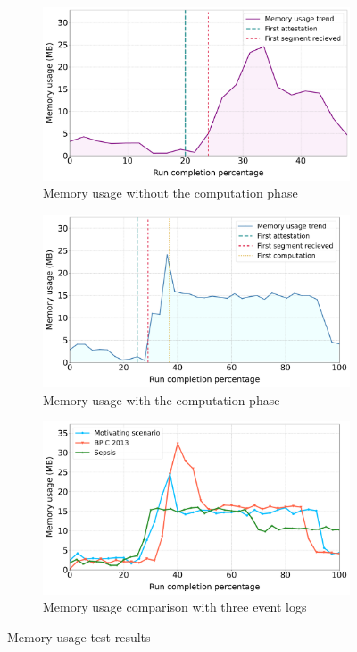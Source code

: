 \begin{figure}[t]
\centering
\begin{subfigure}{0.49\textwidth}
  \centering
  \includegraphics[width=\textwidth]{content/figures/memoryusage1-2.pdf}
  \caption{Memory usage without the computation phase}
  \label{snr_a}
\end{subfigure}\hfill
\begin{subfigure}{0.49\textwidth}
  \centering
  \includegraphics[width=\textwidth]{content/figures/memoryusage2-2.pdf}
  \caption{Memory usage with the computation phase}
  \label{snr_b}   
\end{subfigure}

\begin{subfigure}{0.49\textwidth}   
  \centering      
  \includegraphics[width=\textwidth]{content/figures/memoryusage3-2.pdf}
  \caption{Memory usage comparison with three event logs}
  \label{snr_c}
\end{subfigure}
\caption{Memory usage test results}
\label{fig:memtest}
\end{figure}

